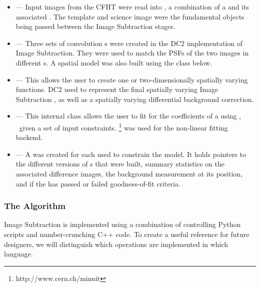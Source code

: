 \begin{itemize}
\item {} ---
   Input images from the CFHT were read into , a
   combination of a  and its associated .
   The template and science image  were the
   fundamental objects being passed between the Image Subtraction
   stages.

\item {} ---
   Three sets of convolution s were created in the DC2
   implementation of Image Subtraction.  They were used to match the
   PSFs of the two images in different s.  A spatial
   model was also built using the  class below.

\item {} ---
   This allows the user to create one or two-dimensionally spatially
   varying functions.  DC2 used  to represent the
   final spatially varying Image Subtraction , as well as
   a spatially varying differential background correction.

\item {} ---
   This internal class allows the user to fit for the coefficients of
   a  using , \
   given a set of input constraints.  
   \footnote{http://www.cern.ch/minuit} was used for
   the non-linear fitting backend.

\item {} ---
   A  was created for each  used
   to constrain the  model.  It holds pointers to the
   different versions of \code{Kernel}s that were built, summary
   statistics on the associated difference images, the background
   measurement at its position, and if the \code{Footprint} has passed
   or failed goodness-of-fit criteria.

\end{itemize}

\subsubsection{The Algorithm}

Image Subtraction is implemented using a combination of controlling
Python scripts and number-crunching C++ code.  To
create a useful reference for future designers, we will distinguish
which operations are implemented in which language.

